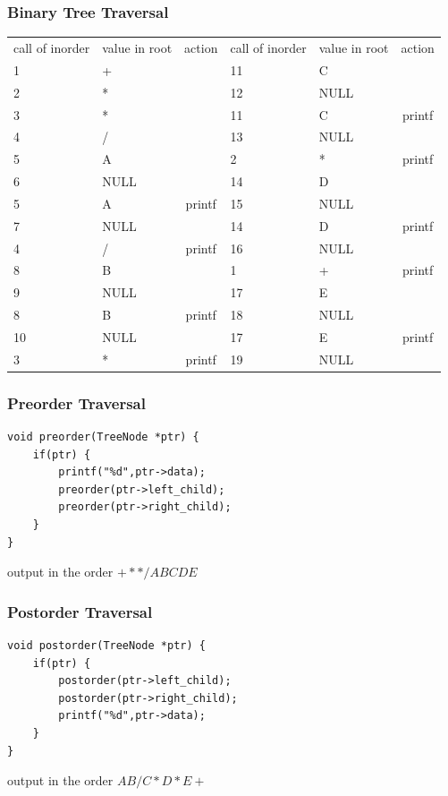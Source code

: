 \documentclass[newPxFont,sthlmFooter,nooffset]{beamer}
\begin{document}
\begin{frame}[t]
  \frametitle{Binary Tree Traversal}
  \begin{tabular}{p{4em} p{4em} c || p{4em} p{4em} c}
call of inorder & value in root & action & call of inorder & value in root & action \\
1	&	+	&		&	11	&	C	&		\\
2	&	*	&		&	12	&	NULL	&		\\
3	&	*	&		&	11	&	C	&	printf	\\
4	&	/	&		&	13	&	NULL	&		\\
5	&	A	&		&	2	&	*	&	printf	\\
6	&	NULL	&		&	14	&	D	&		\\
5	&	A	&	printf	&	15	&	NULL	&		\\
7	&	NULL	&		&	14	&	D	&	printf	\\
4	&	/	&	printf	&	16	&	NULL	&		\\
8	&	B	&		&	1	&	+	&	printf	\\
9	&	NULL	&		&	17	&	E	&		\\
8	&	B	&	printf	&	18	&	NULL	&		\\
10	&	NULL	&		&	17	&	E	&	printf	\\
3	&	*	&	printf	&	19	&	NULL	&		\\    
  \end{tabular}
\end{frame}


\begin{frame}[t, fragile]
  \frametitle{Preorder Traversal}

\begin{lstlisting}
void preorder(TreeNode *ptr) { 
    if(ptr) {
        printf("%d",ptr->data); 
        preorder(ptr->left_child); 
        preorder(ptr->right_child);
    } 
}  
\end{lstlisting}

output in the order $+**/ABCDE$

\end{frame}


\begin{frame}[t, fragile]
  \frametitle{Postorder Traversal}
\begin{lstlisting}
void postorder(TreeNode *ptr) { 
    if(ptr) {
        postorder(ptr->left_child); 
        postorder(ptr->right_child);
        printf("%d",ptr->data); 
    } 
}  
\end{lstlisting}

output in the order $AB/C*D*E+$

\end{frame}
\end{document}

